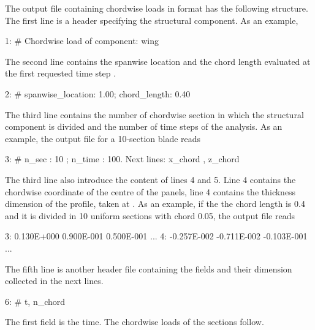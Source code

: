 The output file containing chordwise loads in  format has 
the following structure. The first line is a header specifying the 
structural component. As an example,
\begin{inputfile}[frame=single]
  1: # Chordwise load of component: wing
\end{inputfile}
The second line contains the spanwise location and the chord length evaluated at the first requested
time step .  
\begin{inputfile}[frame=single]
  2: # spanwise_location:    1.00; chord_length:  0.40     
\end{inputfile}
The third line contains the number of chordwise section  in which the 
structural component is divided and the number of time steps 
of the analysis. As an example, the output file for a 10-section blade reads
\begin{inputfile}[frame=single]
 3: # n_sec : 10 ; n_time : 100. Next lines: x_chord , z_chord
\end{inputfile}
The third line also introduce the content of lines 4 and 5. Line 4 contains 
the chordwise coordinate  of the centre of the panels, 
line 4 contains the thickness dimension  of the profile, taken at .
As an example, if the the chord length is 0.4 and it is divided in 10 uniform sections with chord 0.05, 
the output file reads
\begin{inputfile}[frame=single]
 3:  0.130E+000  0.900E-001  0.500E-001 ...
 4: -0.257E-002 -0.711E-002 -0.103E-001 ...
\end{inputfile}
The fifth line is another header file containing the fields and their 
dimension collected in the next  lines.
\begin{inputfile}[frame=single]
  6: # t, n\_chord
\end{inputfile}
The first field is the time. The chordwise loads of the  
sections follow. 

